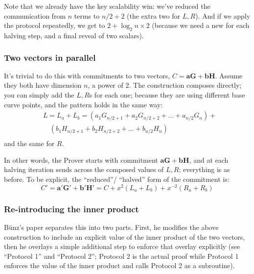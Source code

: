 \documentclass[10pt,a4paper]{article}
\begin{document}
Note that we already have the key scalability win: we've reduced the
communication from $n$ terms to $n/2 + 2$ (the extra two for $L, R$). And if we apply the
protocol repeatedly, we get to $2+\log_2 n \times 2$ (because we need a new for each halving
step, and a final reveal of two scalars).

\hypertarget{two-vectors-in-parallel}{%
\subsubsection[Two vectors in
parallel]{\texorpdfstring{\protect\hypertarget{anchor-50}{}{}Two vectors
in parallel}{Two vectors in parallel}}\label{two-vectors-in-parallel}}

It's trivial to do this with commitments to two vectors, $C = \textbf{aG} + \textbf{bH}$. Assume they
both have dimension $n$, a power of 2. The construction composes directly;
you can simply add the $L, R$s for each one; because they are using different
base curve points, and the pattern holds in the same way:
\begin{align*}
& L = L_a + L_b =  \left(a_1G_{n/2+1} + a_2G_{n/2+2}+\ldots+a_{n/2}G_{n}\right) + \\
& \quad \left(b_1H_{n/2+1} + b_2H_{n/2+2}+\ldots+b_{n/2}H_{n}\right) \\
\end{align*}
and the same for $R$.

In other words, the Prover starts with commitment $\mathbf{aG} + \mathbf{bH}$, and at each halving
iteration sends across the composed values of $L, R$; everything is as before.
To be explicit, the ``reduced''/ ``halved'' form of the commitment is:
\[C' = \textbf{a}'\textbf{G}' + \textbf{b}'\textbf{H}' = C + x^2 (L_a + L_b) + x^{-2}(R_a + R_b)\]

\hypertarget{re-introducing-the-inner-product}{%
\subsubsection[Re-introducing the inner
product]{\texorpdfstring{\protect\hypertarget{anchor-51}{}{}Re-introducing
the inner
product}{Re-introducing the inner product}}\label{re-introducing-the-inner-product}}

Bünz's paper separates this into two parts. First, he modifies the above
construction to include an explicit value of the inner product of the
two vectors, then he overlays a simple additional step to enforce that
overlay explicitly (see ``Protocol 1'' and ``Protocol 2''; Protocol 2 is
the actual proof while Protocol 1 enforces the value of the inner
product and calls Protocol 2 as a subroutine).
\end{document}
